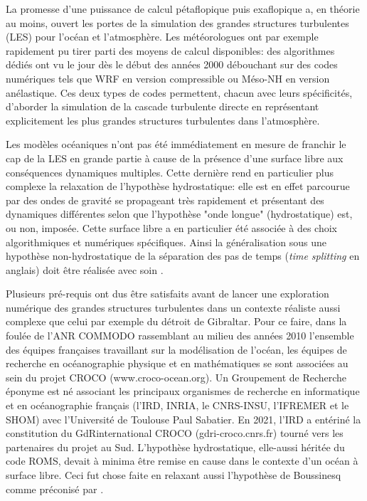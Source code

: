 La promesse d’une puissance de calcul pétaflopique puis exaflopique a, en théorie au moins, ouvert les portes de la simulation des grandes structures turbulentes (LES) pour l’océan et l’atmosphère. Les météorologues ont par exemple rapidement pu tirer parti des moyens de calcul disponibles: des algorithmes dédiés ont vu le jour dès le début des années 2000 débouchant sur des codes numériques tels que WRF \citep{skamarock_prototypes_2001} en version compressible ou Méso-NH \citep{lac_overview_2018} en version anélastique. Ces deux types de codes permettent, chacun avec leurs spécificités, d’aborder la simulation de la cascade turbulente directe en représentant explicitement les plus grandes structures turbulentes dans l’atmosphère.

Les modèles océaniques n’ont pas été immédiatement en mesure de franchir le cap de la LES en grande partie à cause de la présence d’une surface libre aux conséquences dynamiques multiples. Cette dernière rend en particulier plus complexe la relaxation de l’hypothèse hydrostatique: elle est en effet parcourue par des ondes de gravité se propageant très rapidement et présentant des dynamiques différentes selon que l'hypothèse "onde longue" (hydrostatique) est, ou non, imposée. \color{blue}
Cette surface libre a en particulier été associée à des choix algorithmiques et numériques spécifiques. Ainsi la généralisation sous une hypothèse non-hydrostatique de la séparation des pas de temps (\textit{time splitting} en anglais) doit être réalisée avec soin \citep{auclair_non-hydrostatic_2011, Auclair2018}.

Plusieurs pré-requis ont dus être satisfaits avant de lancer une exploration numérique des grandes structures turbulentes dans un contexte réaliste aussi complexe que celui par exemple du détroit de Gibraltar.
Pour ce faire, dans la foulée de l’ANR COMMODO rassemblant au milieu des années 2010 l’ensemble des équipes françaises travaillant sur la modélisation de l’océan, les équipes de recherche en océanographie physique et en mathématiques se sont associées au sein du projet CROCO (www.croco-ocean.org). Un Groupement de Recherche éponyme est né associant les principaux organismes de recherche en informatique et en océanographie français (l’IRD, INRIA, le CNRS-INSU, l’IFREMER et le SHOM) avec l'Université de Toulouse Paul Sabatier. En 2021, l’IRD a entériné la constitution du GdRinternational CROCO (gdri-croco.cnrs.fr) tourné vers les partenaires du projet au Sud. L'hypothèse hydrostatique, elle-aussi héritée du code ROMS, devait à minima être remise en cause dans le contexte d'un océan à surface libre. Ceci fut chose faite en relaxant aussi l'hypothèse de Boussinesq comme préconisé par \cite{Auclair2018}.

